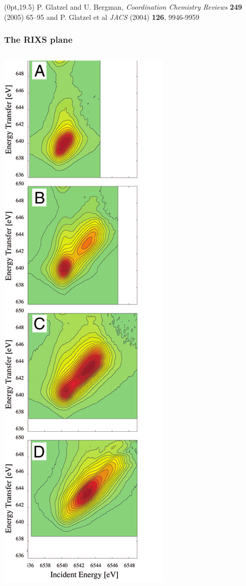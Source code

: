 \documentclass[10pt, xcolor=x11names, compress]{beamer}
\begin{document}
\begin{frame}
  \begin{textblock*}{0.6\linewidth}(0pt,19.5\TPVertModule) \tiny
    P. Glatzel and U. Bergman, \textit{Coordination Chemistry Reviews}
    \textbf{249} (2005) 65–95 and P. Glatzel et al \textit{JACS}
    (2004) \textbf{126}, 9946-9959
  \end{textblock*}
\end{frame}

\begin{frame}
  \frametitle{The RIXS plane}
  \begin{columns}[T]
    \begin{column}{0.3\linewidth}
      \begin{center}
        \includegraphics[width=0.7\linewidth]{pses/XES/mn_rixs.png}

\end{center}
\end{column}
\end{columns}
\end{frame}
\end{document}

